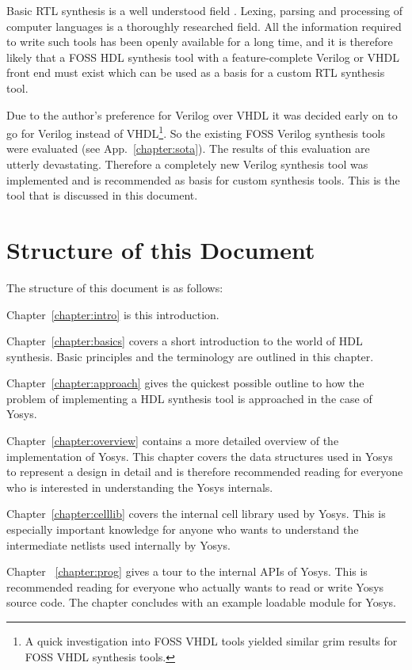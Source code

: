 Basic RTL synthesis is a well understood field \cite{LogicSynthesis}. Lexing,
parsing and processing of computer languages \cite{Dragonbook} is a thoroughly
researched field. All the information required to write such tools has been openly
available for a long time, and it is therefore likely that a FOSS HDL synthesis tool
with a feature-complete Verilog or VHDL front end must exist which can be used as a basis for a custom RTL synthesis tool.

Due to the author's preference for Verilog over VHDL it was decided early
on to go for Verilog instead of VHDL\footnote{A quick investigation into FOSS
VHDL tools yielded similar grim results for FOSS VHDL synthesis tools.}.
So the existing FOSS Verilog synthesis tools were evaluated (see
App.~\ref{chapter:sota}).  The results of this evaluation are utterly
devastating. Therefore a completely new Verilog synthesis tool was implemented
and is recommended as basis for custom synthesis tools. This is the tool that
is discussed in this document.

\section{Structure of this Document}

The structure of this document is as follows:

Chapter~\ref{chapter:intro} is this introduction.

Chapter~\ref{chapter:basics} covers a short introduction to the world of HDL
synthesis. Basic principles and the terminology are outlined in this chapter.

Chapter~\ref{chapter:approach} gives the quickest possible outline to how the
problem of implementing a HDL synthesis tool is approached in the case of
Yosys.

Chapter~\ref{chapter:overview} contains a more detailed overview of the
implementation of Yosys. This chapter covers the data structures used in
Yosys to represent a design in detail and is therefore recommended reading
for everyone who is interested in understanding the Yosys internals.

Chapter~\ref{chapter:celllib} covers the internal cell library used by Yosys.
This is especially important knowledge for anyone who wants to understand the
intermediate netlists used internally by Yosys.

Chapter~ \ref{chapter:prog} gives a tour to the internal APIs of Yosys. This
is recommended reading for everyone who actually wants to read or write
Yosys source code. The chapter concludes with an example loadable module
for Yosys.

